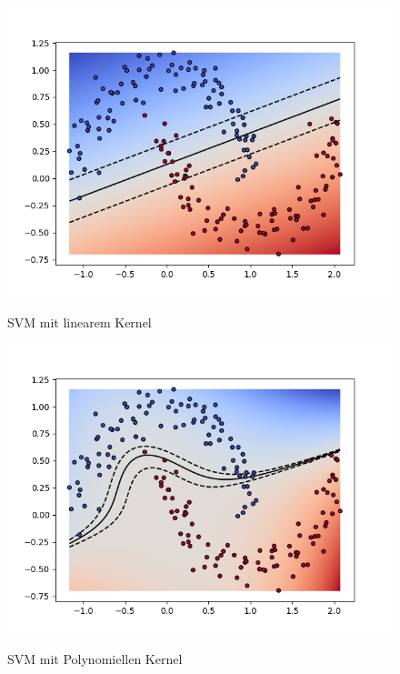 \documentclass[10pt,a4paper]{scrartcl}
\begin{document}
                \begin{figure}[ht] 
                    \label{kernels} 
                    \begin{minipage}[b]{0.5\linewidth}
                        \centering
                        \includegraphics[width=.8\textwidth]{img_kernel/kernelLin.png}
                        \caption{SVM mit linearem Kernel}
                        \vspace{4ex}
                        \label{ker:lin}
                    \end{minipage}
                    \begin{minipage}[b]{0.5\linewidth}
                        \centering
                        \includegraphics[width=.8\textwidth]{img_kernel/kernelPol.png}
                        \caption{SVM mit Polynomiellen Kernel}
                        \vspace{4ex}
                        \label{ker:pol}
                    \end{minipage}
                    \begin{minipage}[b]{0.5\linewidth}

\end{minipage}
\end{figure}
\end{document}

